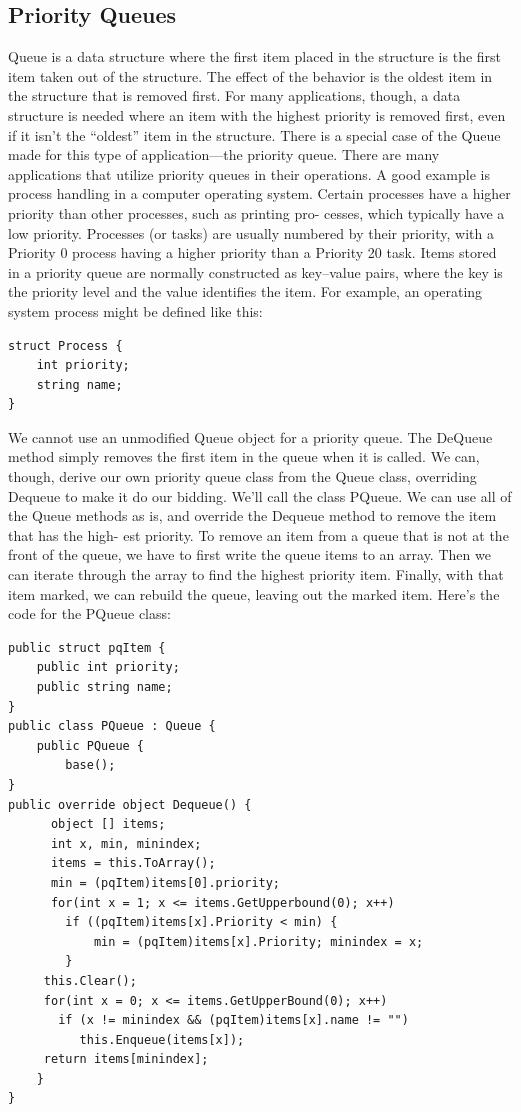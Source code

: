 \documentclass[12pt,a4paper,final,twoside,titlepage]{book}
\begin{document}
\subsection{Priority Queues}
Queue is a data structure where the first item placed in the structure is the first item taken out of the structure. The effect of the behavior is the oldest item in the structure that is removed first. For many applications, though, a data structure is needed where an item with the highest priority is removed first, even if it isn’t the “oldest” item in the structure. There is a special case of the Queue made for this type of application—the priority queue.
There are many applications that utilize priority queues in their operations. A good example is process handling in a computer operating system. Certain processes have a higher priority than other processes, such as printing pro- cesses, which typically have a low priority. Processes (or tasks) are usually numbered by their priority, with a Priority 0 process having a higher priority than a Priority 20 task. Items stored in a priority queue are normally constructed as key–value pairs, where the key is the priority level and the value identifies the item. For example, an operating system process might be defined like this:
\begin{lstlisting}
struct Process { 
	int priority; 
	string name;
}
\end{lstlisting}
We cannot use an unmodified Queue object for a priority queue. The DeQueue method simply removes the first item in the queue when it is called. We can, though, derive our own priority queue class from the Queue class, overriding Dequeue to make it do our bidding. We’ll call the class PQueue. We can use all of the Queue methods as is, and override the Dequeue method to remove the item that has the high- est priority. To remove an item from a queue that is not at the front of the queue, we have to first write the queue items to an array. Then we can iterate through the array to find the highest priority item. Finally, with that item marked, we can rebuild the queue, leaving out the marked item. Here’s the code for the PQueue class:
\begin{lstlisting}
public struct pqItem { 
	public int priority; 
	public string name;
}
public class PQueue : Queue {
	public PQueue { 
		base();
}
public override object Dequeue() {
      object [] items;
      int x, min, minindex;
      items = this.ToArray();
      min = (pqItem)items[0].priority;
      for(int x = 1; x <= items.GetUpperbound(0); x++)
      	if ((pqItem)items[x].Priority < min) { 
      		min = (pqItem)items[x].Priority; minindex = x;
		}
     this.Clear();
     for(int x = 0; x <= items.GetUpperBound(0); x++)
       if (x != minindex && (pqItem)items[x].name != "")
          this.Enqueue(items[x]);
     return items[minindex];
	}
}
\end{lstlisting}
\end{document}
